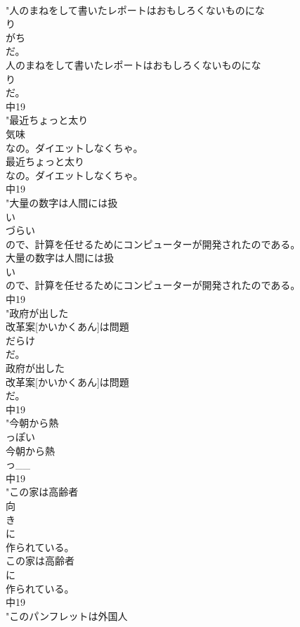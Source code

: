 \documentclass[8pt]{extreport}
\begin{document}
\begin{CJK}{UTF8}{min}
\\	"人のまねをして書いたレポートはおもしろくないものにな
\\	り
\\	がち
\\	だ。
\\	人のまねをして書いたレポートはおもしろくないものにな
\\	り
\\	だ。
\\	中19
\\	"最近ちょっと太り
\\	気味
\\	なの。ダイエットしなくちゃ。
\\	最近ちょっと太り
\\	なの。ダイエットしなくちゃ。
\\	中19
\\	"大量の数字は人間には扱
\\	い
\\	づらい
\\	ので、計算を任せるためにコンピューターが開発されたのである。
\\	大量の数字は人間には扱
\\	い
\\	ので、計算を任せるためにコンピューターが開発されたのである。
\\	中19
\\	"政府が出した
\\	改革案[かいかくあん]は問題
\\	だらけ
\\	だ。
\\	政府が出した
\\	改革案[かいかくあん]は問題
\\	だ。
\\	中19
\\	"今朝から熱
\\	っぽい
\\	今朝から熱
\\	っ__
\\	中19
\\	"この家は高齢者
\\	向
\\	き
\\	に
\\	作られている。
\\	この家は高齢者
\\	に
\\	作られている。
\\	中19
\\	"このパンフレットは外国人

\end{CJK}
\end{document}

